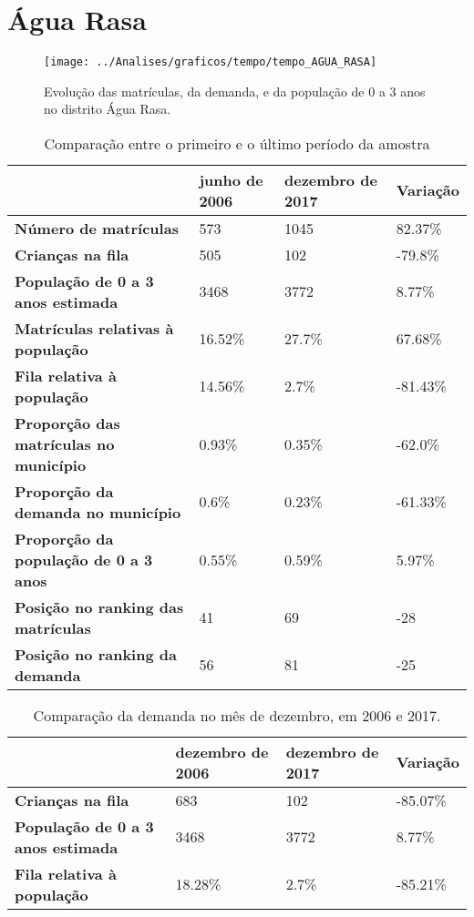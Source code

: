 \section{Água Rasa}
\begin{figure}[H]
\centering
\texttt{[image: ../Analises/graficos/tempo/tempo\_AGUA\_RASA]}
\caption{Evolução das matrículas, da demanda, e da população de 0 a 3 anos no distrito Água Rasa.}
\end{figure}
\begin{table}[H]
\begin{tabular}{|l|l|l|l|}
\hline
\textbf{}                                      & \textbf{junho de 2006}       & \textbf{dezembro de 2017}    & \textbf{Variação} \\ \hline
\textbf{Número de matrículas}                  & 573 & 1045 & 82.37\% \\ \hline
\textbf{Crianças na fila}                      & 505 & 102 & -79.8\% \\ \hline
\textbf{População de 0 a 3 anos estimada}      & 3468 & 3772 & 8.77\% \\ \hline
\textbf{Matrículas relativas à população}      & 16.52\% & 27.7\% & 67.68\% \\ \hline
\textbf{Fila relativa à população}             & 14.56\% & 2.7\% & -81.43\% \\ \hline
\textbf{Proporção das matrículas no município} & 0.93\% & 0.35\% & -62.0\% \\ \hline
\textbf{Proporção da demanda no município}     & 0.6\% & 0.23\% & -61.33\% \\ \hline
\textbf{Proporção da população de 0 a 3 anos}  & 0.55\% & 0.59\% & 5.97\% \\ \hline
\textbf{Posição no ranking das matrículas}     & 41 & 69 & -28 \\ \hline
\textbf{Posição no ranking da demanda}         & 56 & 81 & -25 \\ \hline
\end{tabular}
\caption{Comparação entre o primeiro e o último período da amostra}
\end{table}
\begin{table}[H]
\begin{tabular}{|l|l|l|l|}
\hline
\textbf{}                                 & \textbf{dezembro de 2006} & \textbf{dezembro de 2017} & \textbf{Variação} \\ \hline
\textbf{Crianças na fila}                      & 683 & 102 & -85.07\% \\ \hline
\textbf{População de 0 a 3 anos estimada}      & 3468 & 3772 & 8.77\% \\ \hline
\textbf{Fila relativa à população}             & 18.28\% & 2.7\% & -85.21\% \\ \hline
\end{tabular}
\caption{Comparação da demanda no mês de dezembro, em 2006 e 2017.}
\end{table}
